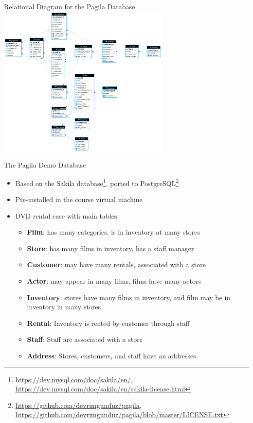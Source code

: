 \documentclass[ignorenonframetext,xcolor=x11names]{beamer}
\begin{document}
\begin{frame}{Relational Diagram for the Pagila Database}
\centering
\includegraphics[height=3in]{pagila2dbeaver.png}
\end{frame}

\begin{frame}{The Pagila Demo Database}

\begin{itemize}
  \item Based on the Sakila database\footnote{\scriptsize\url{https://dev.mysql.com/doc/sakila/en/}, 
\url{https://dev.mysql.com/doc/sakila/en/sakila-license.html}}, ported to PostgreSQL\footnote{\scriptsize\url{https://github.com/devrimgunduz/pagila},
\url{https://github.com/devrimgunduz/pagila/blob/master/LICENSE.txt}}
  \item Pre-installed in the course virtual machine
  \item DVD rental case with main tables:
  \begin{itemize}
	\item \textbf{Film}: has many categories, is in inventory at many stores
	\item \textbf{Store}: has many films in inventory, has a staff manager
	\item \textbf{Customer}: may have many rentals, associated with a store
	\item \textbf{Actor}: may appear in many films, films have many actors
	\item \textbf{Inventory}: stores have many films in inventory, and film may be in inventory in many stores
	\item \textbf{Rental}: Inventory is rented by customer through staff
	\item \textbf{Staff}: Staff are associated with a store
	\item \textbf{Address}: Stores, customers, and staff have an addresses
  \end{itemize}
\end{itemize}
\end{frame}
\end{document}
